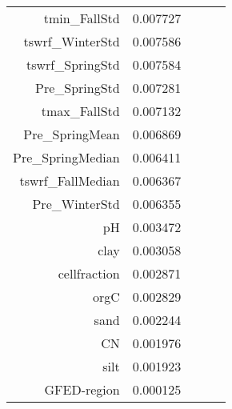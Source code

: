 \begin{tabular}{rrrrr}
tmin_FallStd & 0.007727 \\
tswrf_WinterStd & 0.007586 \\
tswrf_SpringStd & 0.007584 \\
Pre_SpringStd & 0.007281 \\
tmax_FallStd & 0.007132 \\
Pre_SpringMean & 0.006869 \\
Pre_SpringMedian & 0.006411 \\
tswrf_FallMedian & 0.006367 \\
Pre_WinterStd & 0.006355 \\
pH & 0.003472 \\
clay & 0.003058 \\
cellfraction & 0.002871 \\
orgC & 0.002829 \\
sand & 0.002244 \\
CN & 0.001976 \\
silt & 0.001923 \\
GFED-region & 0.000125 \\
\bottomrule
\end{tabular}
